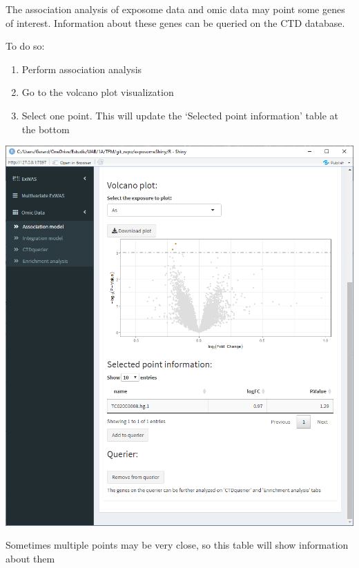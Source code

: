 \documentclass[
]{book}
\providecommand{\tightlist}{%
  \setlength{\itemsep}{0pt}\setlength{\parskip}{0pt}}
\begin{document}
The association analysis of exposome data and omic data may point some genes of interest. Information about these genes can be queried on the CTD database.

To do so:

\begin{enumerate}
\def\labelenumi{\arabic{enumi}.}
\tightlist
\item
  Perform association analysis
\item
  Go to the volcano plot visualization
\item
  Select one point. This will update the `Selected point information' table at the bottom
\end{enumerate}

\includegraphics{images/analysis10_2.png}

Sometimes multiple points may be very close, so this table will show information about them
\end{document}
